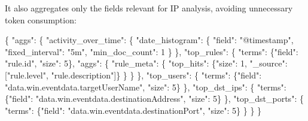\documentclass[
]{article}
\newenvironment{Shaded}{}{}
\newcommand{\DataTypeTok}[1]{\textcolor[rgb]{0.56,0.13,0.00}{#1}}
\newcommand{\DecValTok}[1]{\textcolor[rgb]{0.25,0.63,0.44}{#1}}
\newcommand{\FunctionTok}[1]{\textcolor[rgb]{0.02,0.16,0.49}{#1}}
\newcommand{\OtherTok}[1]{\textcolor[rgb]{0.00,0.44,0.13}{#1}}
\newcommand{\StringTok}[1]{\textcolor[rgb]{0.25,0.44,0.63}{#1}}
\begin{document}
It also aggregates only the fields relevant for IP analysis, avoiding
unnecessary token consumption:

\begin{Shaded}
\begin{Highlighting}[]
\FunctionTok{\{}
  \DataTypeTok{"aggs"}\FunctionTok{:} \FunctionTok{\{}
    \DataTypeTok{"activity\_over\_time"}\FunctionTok{:} \FunctionTok{\{}
      \DataTypeTok{"date\_histogram"}\FunctionTok{:} \FunctionTok{\{}
        \DataTypeTok{"field"}\FunctionTok{:} \StringTok{"@timestamp"}\FunctionTok{,}
        \DataTypeTok{"fixed\_interval"}\FunctionTok{:} \StringTok{"5m"}\FunctionTok{,}
        \DataTypeTok{"min\_doc\_count"}\FunctionTok{:} \DecValTok{1}
      \FunctionTok{\}}
    \FunctionTok{\},}
    \DataTypeTok{"top\_rules"}\FunctionTok{:} \FunctionTok{\{}
      \DataTypeTok{"terms"}\FunctionTok{:} \FunctionTok{\{}\DataTypeTok{"field"}\FunctionTok{:} \StringTok{"rule.id"}\FunctionTok{,} \DataTypeTok{"size"}\FunctionTok{:} \DecValTok{5}\FunctionTok{\},}
      \DataTypeTok{"aggs"}\FunctionTok{:} \FunctionTok{\{}
        \DataTypeTok{"rule\_meta"}\FunctionTok{:} \FunctionTok{\{}
          \DataTypeTok{"top\_hits"}\FunctionTok{:} \FunctionTok{\{}\DataTypeTok{"size"}\FunctionTok{:} \DecValTok{1}\FunctionTok{,} \DataTypeTok{"\_source"}\FunctionTok{:} \OtherTok{[}\StringTok{"rule.level"}\OtherTok{,} \StringTok{"rule.description"}\OtherTok{]}\FunctionTok{\}}
        \FunctionTok{\}}
      \FunctionTok{\}}
    \FunctionTok{\},}
    \DataTypeTok{"top\_users"}\FunctionTok{:} \FunctionTok{\{}
      \DataTypeTok{"terms"}\FunctionTok{:} \FunctionTok{\{}\DataTypeTok{"field"}\FunctionTok{:} \StringTok{"data.win.eventdata.targetUserName"}\FunctionTok{,} \DataTypeTok{"size"}\FunctionTok{:} \DecValTok{5}\FunctionTok{\}}
    \FunctionTok{\},}
    \DataTypeTok{"top\_dst\_ips"}\FunctionTok{:} \FunctionTok{\{}
      \DataTypeTok{"terms"}\FunctionTok{:} \FunctionTok{\{}\DataTypeTok{"field"}\FunctionTok{:} \StringTok{"data.win.eventdata.destinationAddress"}\FunctionTok{,} \DataTypeTok{"size"}\FunctionTok{:} \DecValTok{5}\FunctionTok{\}}
    \FunctionTok{\},}
    \DataTypeTok{"top\_dst\_ports"}\FunctionTok{:} \FunctionTok{\{}
      \DataTypeTok{"terms"}\FunctionTok{:} \FunctionTok{\{}\DataTypeTok{"field"}\FunctionTok{:} \StringTok{"data.win.eventdata.destinationPort"}\FunctionTok{,} \DataTypeTok{"size"}\FunctionTok{:} \DecValTok{5}\FunctionTok{\}}
    \FunctionTok{\}}
  \FunctionTok{\}}
\FunctionTok{\}}
\end{Highlighting}
\end{Shaded}
\end{document}
